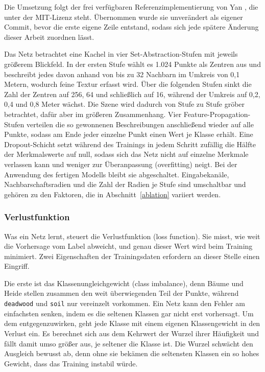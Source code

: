 Die Umsetzung folgt der frei verfügbaren Referenzimplementierung von Yan \cite{Yan.2019}, die unter der MIT-Lizenz steht. Übernommen wurde sie unverändert als eigener Commit, bevor die erste eigene Zeile entstand, sodass sich jede spätere Änderung dieser Arbeit zuordnen lässt.

Das Netz betrachtet eine Kachel in vier Set-Abstraction-Stufen mit jeweils größerem Blickfeld. In der ersten Stufe wählt es 1.024 Punkte als Zentren aus und beschreibt jedes davon anhand von bis zu 32 Nachbarn im Umkreis von 0,1 Metern, wodurch feine Textur erfasst wird. Über die folgenden Stufen sinkt die Zahl der Zentren auf 256, 64 und schließlich auf 16, während der Umkreis auf 0,2, 0,4 und 0,8 Meter wächst. Die Szene wird dadurch von Stufe zu Stufe gröber betrachtet, dafür aber im größeren Zusammenhang. Vier Feature-Propagation-Stufen verteilen die so gewonnenen Beschreibungen anschließend wieder auf alle Punkte, sodass am Ende jeder einzelne Punkt einen Wert je Klasse erhält. Eine Dropout-Schicht setzt während des Trainings in jedem Schritt zufällig die Hälfte der Merkmalswerte auf null, sodass sich das Netz nicht auf einzelne Merkmale verlassen kann und weniger zur Überanpassung (overfitting) neigt. Bei der Anwendung des fertigen Modells bleibt sie abgeschaltet. Eingabekanäle, Nachbarschaftsradien und die Zahl der Radien je Stufe sind umschaltbar und gehören zu den Faktoren, die in Abschnitt~\ref{ablation} variiert werden.

\subsubsection{Verlustfunktion}\label{verlustfunktion}
Was ein Netz lernt, steuert die Verlustfunktion (loss function). Sie misst, wie weit die Vorhersage vom Label abweicht, und genau dieser Wert wird beim Training minimiert. Zwei Eigenschaften der Trainingsdaten erfordern an dieser Stelle einen Eingriff.

Die erste ist das Klassenungleichgewicht (class imbalance), denn Bäume und Heide stellen zusammen den weit überwiegenden Teil der Punkte, während \texttt{deadwood} und \texttt{soil} nur vereinzelt vorkommen. Ein Netz kann den Fehler am einfachsten senken, indem es die seltenen Klassen gar nicht erst vorhersagt. Um dem entgegenzuwirken, geht jede Klasse mit einem eigenen Klassengewicht in den Verlust ein. Es berechnet sich aus dem Kehrwert der Wurzel ihrer Häufigkeit und fällt damit umso größer aus, je seltener die Klasse ist. Die Wurzel schwächt den Ausgleich bewusst ab, denn ohne sie bekämen die seltensten Klassen ein so hohes Gewicht, dass das Training instabil würde.

